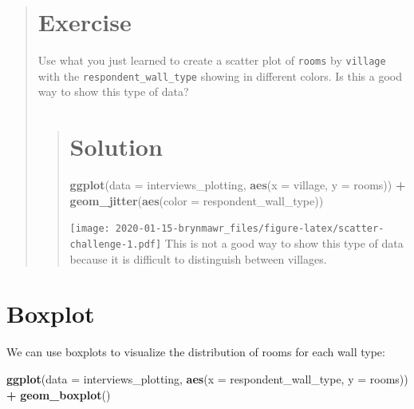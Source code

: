 \documentclass[]{book}
\newenvironment{Shaded}{\begin{snugshade}}{\end{snugshade}}
\newcommand{\KeywordTok}[1]{\textcolor[rgb]{0.13,0.29,0.53}{\textbf{#1}}}
\newcommand{\DataTypeTok}[1]{\textcolor[rgb]{0.13,0.29,0.53}{#1}}
\newcommand{\StringTok}[1]{\textcolor[rgb]{0.31,0.60,0.02}{#1}}
\newcommand{\OperatorTok}[1]{\textcolor[rgb]{0.81,0.36,0.00}{\textbf{#1}}}
\newcommand{\NormalTok}[1]{#1}
\begin{document}
\begin{quote}
\section{Exercise}\label{exercise-11}

Use what you just learned to create a scatter plot of \texttt{rooms} by
\texttt{village} with the \texttt{respondent\_wall\_type} showing in
different colors. Is this a good way to show this type of data?

\begin{quote}
\section{Solution}\label{solution-13}

\begin{Shaded}
\begin{Highlighting}[]
\KeywordTok{ggplot}\NormalTok{(}\DataTypeTok{data =}\NormalTok{ interviews_plotting, }\KeywordTok{aes}\NormalTok{(}\DataTypeTok{x =}\NormalTok{ village, }\DataTypeTok{y =}\NormalTok{ rooms)) }\OperatorTok{+}
\KeywordTok{geom_jitter}\NormalTok{(}\KeywordTok{aes}\NormalTok{(}\DataTypeTok{color =}\NormalTok{ respondent_wall_type))}
\end{Highlighting}
\end{Shaded}

\texttt{[image: 2020-01-15-brynmawr\_files/figure-latex/scatter-challenge-1.pdf]}
This is not a good way to show this type of data because it is difficult
to distinguish between villages.
\end{quote}
\end{quote}

\section{Boxplot}\label{boxplot}

We can use boxplots to visualize the distribution of rooms for each wall
type:

\begin{Shaded}
\begin{Highlighting}[]
\KeywordTok{ggplot}\NormalTok{(}\DataTypeTok{data =}\NormalTok{ interviews_plotting, }\KeywordTok{aes}\NormalTok{(}\DataTypeTok{x =}\NormalTok{ respondent_wall_type, }\DataTypeTok{y =}\NormalTok{ rooms)) }\OperatorTok{+}
\StringTok{    }\KeywordTok{geom_boxplot}\NormalTok{()}
\end{Highlighting}
\end{Shaded}
\end{document}
